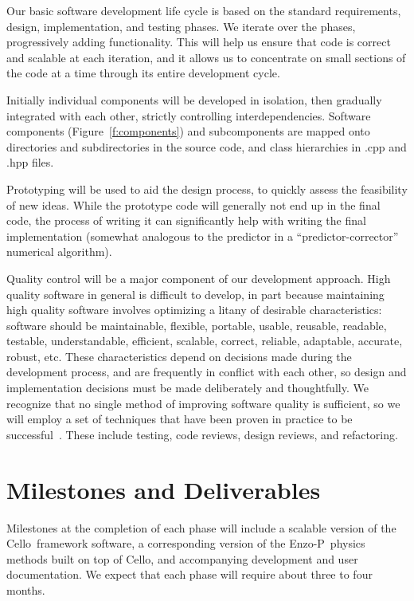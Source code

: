 \documentclass[11pt,letterpaper]{article}
\newcommand{\cello}{\textsf{Cello}}
\newcommand{\enzoii}{\textsf{Enzo-P}}
\begin{document}
Our basic software development life cycle is based on the standard
requirements, design, implementation, and testing phases.  We iterate
over the phases, progressively adding functionality.  This will help
us ensure that code is correct and scalable at each iteration, and it
allows us to concentrate on small sections of the code at a time
through its entire development cycle.  

Initially individual components will be developed in isolation, then
gradually integrated with each other, strictly controlling
interdependencies.  Software components (Figure~\ref{f:components})
and subcomponents are mapped onto directories and subdirectories in
the source code, and class hierarchies in .cpp and .hpp files.

Prototyping will be used to aid the design process, to quickly assess
the feasibility of new ideas.  While the prototype code will generally
not end up in the final code, the process of writing it can
significantly help with writing the final implementation (somewhat
analogous to the predictor in a ``predictor-corrector'' numerical
algorithm).

Quality control will be a major component of our development approach.
High quality software in general is difficult to develop, in part
because maintaining high quality software involves optimizing a litany
of desirable characteristics: software should be maintainable,
flexible, portable, usable, reusable, readable, testable,
understandable, efficient, scalable, correct, reliable, adaptable,
accurate, robust, etc.  These characteristics depend on decisions made
during the development process, and are frequently in conflict with
each other, so design and implementation decisions must be made
deliberately and thoughtfully.  We recognize that no single method of
improving software quality is sufficient, so we will employ a set of
techniques that have been proven in practice to be
successful~\cite{Mc04}.  These include testing, code reviews, design
reviews, and refactoring.



\section{Milestones and Deliverables} \label{s:milestones}

Milestones at the completion of each phase will include a scalable
version of the \cello\ framework software, a corresponding version of
the \enzoii\ physics methods built on top of \cello, and accompanying
development and user documentation.  We expect that each phase will
require about three to four months.
\end{document}

